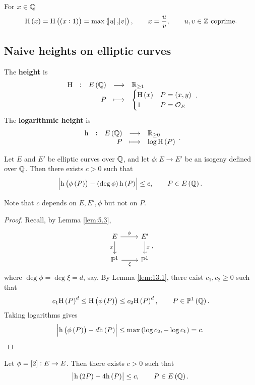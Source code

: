 \begin{notation*}
For $ x \in \mathbb{Q} $
$$ \H\br{x} = \H\br{\br{x : 1}} = \max\br{\abs{u}, \abs{v}}, \qquad x = \dfrac{u}{v}, \qquad u, v \in \ZZ \ \text{coprime}. $$
\end{notation*}

\pagebreak

\subsection{Naive heights on elliptic curves}

\begin{definition*}
The \textbf{height} is
$$ \function[\H]{E\br{\QQ}}{\RR_{\ge 1}}{P}{
\begin{cases}
\H\br{x} & P = \br{x, y} \\
1 & P = \OOO_E
\end{cases}
}. $$
The \textbf{logarithmic height} is
$$ \function[\h]{E\br{\QQ}}{\RR_{\ge 0}}{P}{\log \H\br{P}}. $$
\end{definition*}

\begin{lemma}
\label{lem:13.2}
Let $ E $ and $ E' $ be elliptic curves over $ \mathbb{Q} $, and let $ \phi : E \to E' $ be an isogeny defined over $ \mathbb{Q} $. Then there exists $ c > 0 $ such that
$$ \abs{\h\br{\phi\br{P}} - \br{\deg \phi}\h\br{P}} \le c, \qquad P \in E\br{\QQ}. $$
\end{lemma}

Note that $ c $ depends on $ E, E', \phi $ but not on $ P $.

\begin{proof}
Recall, by Lemma \ref{lem:5.3},
$$
\begin{tikzcd}
E \arrow{r}{\phi} \arrow{d}[swap]{x} & E' \arrow{d}{x} \\
\PP^1 \arrow{r}[swap]{\xi} & \PP^1
\end{tikzcd},
$$
where $ \deg \phi = \deg \xi = d $, say. By Lemma \ref{lem:13.1}, there exist $ c_1, c_2 \ge 0 $ such that
$$ c_1\H\br{P}^d \le \H\br{\phi\br{P}} \le c_2\H\br{P}^d, \qquad P \in \PP^1\br{\QQ}. $$
Taking logarithms gives
$$ \abs{\h\br{\phi\br{P}} - d\h\br{P}} \le \max\br{\log c_2, -\log c_1} = c. $$
\end{proof}

\begin{example*}
Let $ \phi = \sbr{2} : E \to E $. Then there exists $ c > 0 $ such that
\begin{equation}
\label{eq:15}
\abs{\h\br{2P} - 4\h\br{P}} \le c, \qquad P \in E\br{\QQ}.
\end{equation}
\end{example*}

